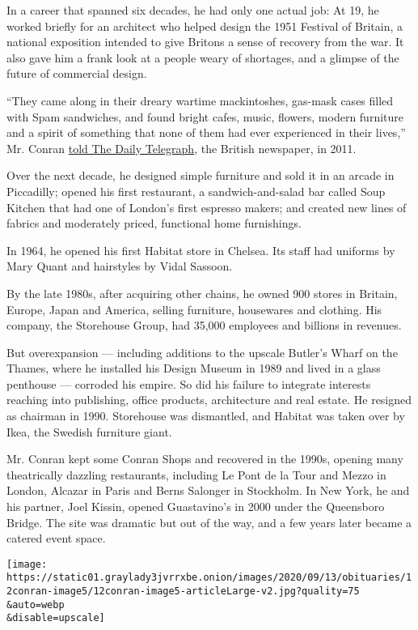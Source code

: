 In a career that spanned six decades, he had only one actual job: At 19,
he worked briefly for an architect who helped design the 1951 Festival
of Britain, a national exposition intended to give Britons a sense of
recovery from the war. It also gave him a frank look at a people weary
of shortages, and a glimpse of the future of commercial design.

``They came along in their dreary wartime mackintoshes, gas-mask cases
filled with Spam sandwiches, and found bright cafes, music, flowers,
modern furniture and a spirit of something that none of them had ever
experienced in their lives,'' Mr. Conran
\href{https://www.telegraph.co.uk/lifestyle/interiors/8750145/The-taste-maker-interview-with-Terence-Conran.html}{told
The Daily Telegraph}, the British newspaper, in 2011.

Over the next decade, he designed simple furniture and sold it in an
arcade in Piccadilly; opened his first restaurant, a sandwich-and-salad
bar called Soup Kitchen that had one of London's first espresso makers;
and created new lines of fabrics and moderately priced, functional home
furnishings.

In 1964, he opened his first Habitat store in Chelsea. Its staff had
uniforms by Mary Quant and hairstyles by Vidal Sassoon.

By the late 1980s, after acquiring other chains, he owned 900 stores in
Britain, Europe, Japan and America, selling furniture, housewares and
clothing. His company, the Storehouse Group, had 35,000 employees and
billions in revenues.

But overexpansion --- including additions to the upscale Butler's Wharf
on the Thames, where he installed his Design Museum in 1989 and lived in
a glass penthouse --- corroded his empire. So did his failure to
integrate interests reaching into publishing, office products,
architecture and real estate. He resigned as chairman in 1990.
Storehouse was dismantled, and Habitat was taken over by Ikea, the
Swedish furniture giant.

Mr. Conran kept some Conran Shops and recovered in the 1990s, opening
many theatrically dazzling restaurants, including Le Pont de la Tour and
Mezzo in London, Alcazar in Paris and Berns Salonger in Stockholm. In
New York, he and his partner, Joel Kissin, opened Guastavino's in 2000
under the Queensboro Bridge. The site was dramatic but out of the way,
and a few years later became a catered event space.

\texttt{[image: https://static01.graylady3jvrrxbe.onion/images/2020/09/13/obituaries/12conran-image5/12conran-image5-articleLarge-v2.jpg?quality=75\\\&auto=webp\\\&disable=upscale]}

